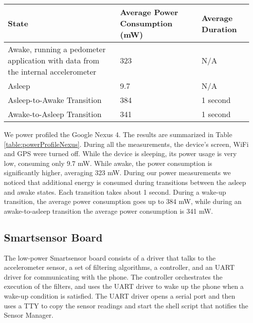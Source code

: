 \begin{table*}[t]

	\begin{tabular}{| p{7cm} | l | l |}
		\hline
		State & Average Power Consumption (mW) & Average Duration \\ \hline
		Awake, running a pedometer application with data from the internal accelerometer & 323 & N/A \\ \hline
		Asleep & 9.7 & N/A \\ \hline
		Asleep-to-Awake Transition & 384 & 1 second \\ \hline
		Awake-to-Asleep Transition & 341 & 1 second \\ \hline
	\end{tabular}
	\caption{Power Profile for the Google Nexus 4}
	\label{table:powerProfileNexus}
\end{table*}

We power profiled the Google Nexus 4. The results are summarized in
Table \ref{table:powerProfileNexus}. During all the measurements, the
device's screen, WiFi and GPS were turned off.  While the device is
sleeping, its power usage is very low, consuming only 9.7 mW. While
awake, the power consumption is significantly higher, averaging 323
mW. During our power measurements we noticed that additional energy is
consumed during transitions between the asleep and awake states. Each
transition takes about 1 second. During a wake-up transition, the
average power consumption goes up to 384 mW, while during an
awake-to-asleep transition the average power consumption is 341 mW.


\subsection{Smartsensor Board}
\label{subsec:sensorBoard}

The low-power Smartsensor board consists of a driver that talks to
the accelerometer sensor, a set of filtering algorithms, a controller,
and an UART driver for communicating with the phone. The controller
orchestrates the execution of the filters, and uses the UART driver to
wake up the phone when a wake-up condition is satisfied.  The UART driver
opens a serial port and then uses a TTY to copy the sensor readings
and start the shell script that notifies the Sensor Manager.


